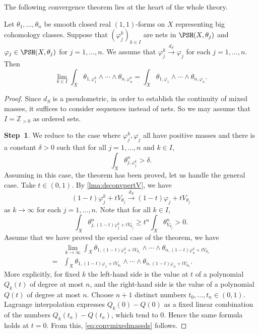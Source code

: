 The following convergence theorem lies at the heart of the whole theory.
\begin{theorem}\label{thm:convdS}
    Let $\theta_1,\ldots,\theta_n$ be smooth closed real $(1,1)$-forms on $X$ representing big cohomology classes. Suppose that $(\varphi_j^k)_{k\in I}$ are nets in $\PSH(X,\theta_j)$ and $\varphi_j\in \PSH(X,\theta_j)$ for $j=1,\ldots,n$. We assume that $\varphi_j^k\xrightarrow{d_S}\varphi_j$ for each $j=1,\ldots,n$. Then
    \begin{equation}\label{eq:convmixedmassds}
        \lim_{k\in I}\int_X\theta_{1,\varphi_1^k}\wedge\cdots\wedge \theta_{n,\varphi_n^k}=\int_X\theta_{1,\varphi_1}\wedge\cdots\wedge \theta_{n,\varphi_n}.
    \end{equation}
\end{theorem}
\begin{proof}
Since $d_S$ is a pseudometric, in order to establish the continuity of mixed masses, it suffices to consider sequences instead of nets. So we may assume that $I=\mathbb{Z}_{>0}$ as ordered sets.

\textbf{Step~1}. We reduce to the case where $\varphi_j^k,\varphi_j$ all have positive masses and there is a constant $\delta>0$ such that for all $j=1,\ldots,n$ and $k\in I$,
	\[
		\int_X \theta_{j,\varphi_j^k}^n>\delta.
	\]
    Assuming in this case, the theorem has been proved, let us handle the general case.
    Take $t\in (0,1)$.
    By \cref{lma:dsconvpertV}, we have
    \[
    (1-t)\varphi_j^k+tV_{\theta_j}\xrightarrow{d_S}(1-t)\varphi_j+tV_{\theta_j}
    \]
    as $k\to\infty$ for each $j=1,\ldots,n$.
    Note that for all $k\in I$,
    \[
        \int_X \theta^n_{j,(1-t)\varphi_j^k+tV_{\theta_j}}\geq t^n\int_X \theta_{V_{\theta_j}}^n>0.
    \]
    Assume that we have proved the special case of the theorem, we have
    \[
    \begin{split}
    &\lim_{k\to\infty}\int_X\theta_{1,(1-t)\varphi_1^k+tV_{\theta_1}}\wedge\cdots\wedge \theta_{n,(1-t)\varphi_n^k+tV_{\theta_n}}\\
    =&\int_X\theta_{1,(1-t)\varphi_1+tV_{\theta_1}}\wedge\cdots\wedge \theta_{n,(1-t)\varphi_n+tV_{\theta_n}}.
    \end{split}
    \]
    More explicitly, for fixed $k$ the left-hand side is the value at $t$ of a polynomial $Q_k(t)$ of degree at most $n$, and the right-hand side is the value of a polynomial $Q(t)$ of degree at most $n$. Choose $n+1$ distinct numbers $t_0,\ldots,t_n\in (0,1)$. Lagrange interpolation expresses $Q_k(0)-Q(0)$ as a fixed linear combination of the numbers $Q_k(t_a)-Q(t_a)$, which tend to $0$. Hence the same formula holds at $t=0$.
    From this, \eqref{eq:convmixedmassds} follows.




\end{proof}
